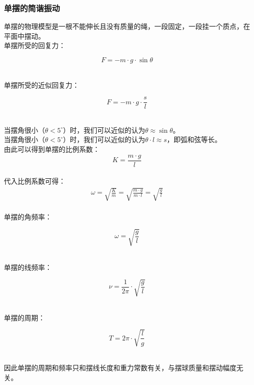 \documentclass[UTF8]{ctexart}
\begin{document}
\subsubsection{单摆的简谐振动}
    单摆的物理模型是一根不能伸长且没有质量的绳，一段固定，一段挂一个质点，在平面中摆动。\\[3mm]
    单摆所受的回复力：
    \begin{large}
        \begin{equation*}
            F=-m\cdot g\cdot \sin{\theta}
        \end{equation*}
    \end{large}\\
    单摆所受的近似回复力：
    \begin{large}
        \begin{equation*}
            F=-m\cdot g\cdot \frac{s}{l}
        \end{equation*}
    \end{large}\\
    当摆角很小（$\theta<5^{\circ}$）时，我们可以近似的认为$\theta\approx\sin{\theta}$。\\[3mm]
    当摆角很小（$\theta<5^{\circ}$）时，我们可以近似的认为$\theta\cdot l\approx s$，即弧和弦等长。\\[5mm]
    由此可以得到单摆的比例系数：\vspace{5pt}
    \setcounter{equation}{0}
    \begin{equation}
        K=\frac{m\cdot g}{l}
    \end{equation}\\
    代入比例系数可得：
    \begin{align}
        \omega=\sqrt{\frac{K}{m}}=\sqrt{\frac{m\cdot g}{m\cdot l}}=\sqrt{\frac{g}{l}}
    \end{align}\\
    单摆的角频率：
    \begin{large}
        \begin{equation*}
            \omega=\sqrt{\frac{g}{l}}
        \end{equation*}
    \end{large}\\
    单摆的线频率：
    \begin{large}
        \begin{equation*}
            \nu=\frac{1}{2\pi}\cdot\sqrt{\frac{g}{l}}
        \end{equation*}
    \end{large}\\
    单摆的周期：
    \begin{large}
        \begin{equation*}
            T=2\pi\cdot\sqrt{\frac{l}{g}}
        \end{equation*}
    \end{large}\\
    因此单摆的周期和频率只和摆线长度和重力常数有关，与摆球质量和摆动幅度无关。
\end{document}
